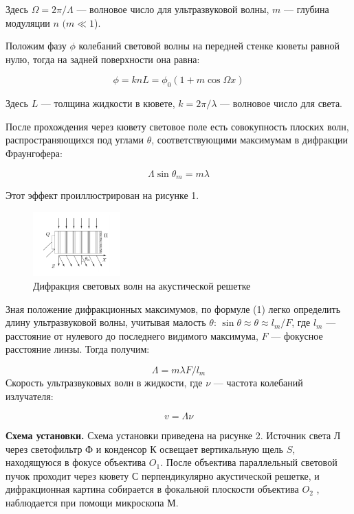 \documentclass[a4paper, 12pt]{article}%
\begin{document}
	Здесь $ \Omega = 2 \pi / \Lambda $ --- волновое число для ультразвуковой волны, $ m $ --- глубина модуляции $ n $ $ (m \ll 1 $).
	
	Положим фазу $ \phi $ колебаний световой волны на передней стенке кюветы равной нулю, тогда на задней поверхности она равна:
	
	\begin{equation}\label{}
	\phi  = k n L = \phi_0 (1 + m \cos \Omega x)
	\end{equation}
	
	Здесь $ L $ --- толщина жидкости в кювете, $ k = 2 \pi / \lambda $ --- волновое число для света.
	
	После прохождения через кювету световое поле есть совокупность плоских волн, распространяющихся под углами $ \theta $, соответствующими максимумам в дифракции Фраунгофера:
	
\begin{equation}\label{}	
	\Lambda \sin \theta_m = m \lambda
\end{equation}

	Этот эффект проиллюстрирован на рисунке 1.
	\begin{figure}[h!]
		\centering	
		\includegraphics[width=0.3\textwidth]{images/wave.png}
		\caption{Дифракция световых волн на акустической решетке}
		\label{diff}
	\end{figure}
    Зная положение дифракционных максимумов, по формуле (1) легко определить длину ультразвуковой волны, учитывая малость $ \theta $: $ \sin \theta \approx \theta \approx l_m /F  $, где $ l_m $ --- расстояние от нулевого до последнего видимого максимума, $ F $ --- фокусное расстояние линзы. Тогда получим:
    	
    	\begin{equation}\label{}
    	 \Lambda = m \lambda F/ l_m 
    	\end{equation}
    	Скорость ультразвуковых волн в жидкости, где $ \nu $ --- частота колебаний излучателя:
    	
    \begin{equation}\label{}
    	v = \Lambda \nu 
    \end{equation}
    
    \textbf{Схема установки. }Схема установки приведена на рисунке 2. Источник света Л через светофильтр Ф и конденсор К освещает вертикальную щель $ S $, находящуюся в фокусе объектива $ O_1 $. После объектива параллельный световой пучок проходит через кювету С перпендикулярно акустической решетке, и дифракционная картина собирается в фокальной плоскости объектива $ O_2 $ , наблюдается при помощи микроскопа М.
\end{document}
